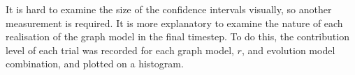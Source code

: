 It is hard to examine the size of the confidence intervals visually, so another measurement is required. It is more explanatory to examine the nature of each realisation of the graph model in the final timestep. To do this, the contribution level of each trial was recorded for each graph model, $r$, and evolution model combination, and plotted on a histogram.

